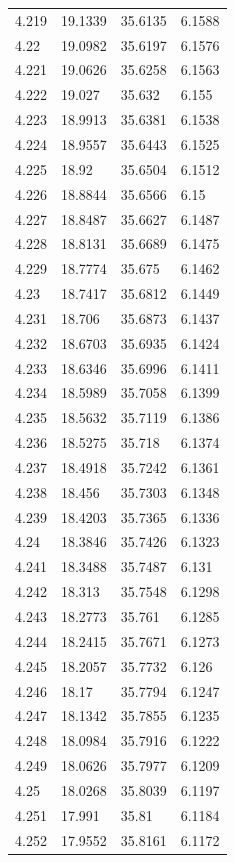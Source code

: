 \begin{tabular}{llll}
4.219 & 19.1339 & 35.6135 & 6.1588 \\
4.22 & 19.0982 & 35.6197 & 6.1576 \\
4.221 & 19.0626 & 35.6258 & 6.1563 \\
4.222 & 19.027 & 35.632 & 6.155 \\
4.223 & 18.9913 & 35.6381 & 6.1538 \\
4.224 & 18.9557 & 35.6443 & 6.1525 \\
4.225 & 18.92 & 35.6504 & 6.1512 \\
4.226 & 18.8844 & 35.6566 & 6.15 \\
4.227 & 18.8487 & 35.6627 & 6.1487 \\
4.228 & 18.8131 & 35.6689 & 6.1475 \\
4.229 & 18.7774 & 35.675 & 6.1462 \\
4.23 & 18.7417 & 35.6812 & 6.1449 \\
4.231 & 18.706 & 35.6873 & 6.1437 \\
4.232 & 18.6703 & 35.6935 & 6.1424 \\
4.233 & 18.6346 & 35.6996 & 6.1411 \\
4.234 & 18.5989 & 35.7058 & 6.1399 \\
4.235 & 18.5632 & 35.7119 & 6.1386 \\
4.236 & 18.5275 & 35.718 & 6.1374 \\
4.237 & 18.4918 & 35.7242 & 6.1361 \\
4.238 & 18.456 & 35.7303 & 6.1348 \\
4.239 & 18.4203 & 35.7365 & 6.1336 \\
4.24 & 18.3846 & 35.7426 & 6.1323 \\
4.241 & 18.3488 & 35.7487 & 6.131 \\
4.242 & 18.313 & 35.7548 & 6.1298 \\
4.243 & 18.2773 & 35.761 & 6.1285 \\
4.244 & 18.2415 & 35.7671 & 6.1273 \\
4.245 & 18.2057 & 35.7732 & 6.126 \\
4.246 & 18.17 & 35.7794 & 6.1247 \\
4.247 & 18.1342 & 35.7855 & 6.1235 \\
4.248 & 18.0984 & 35.7916 & 6.1222 \\
4.249 & 18.0626 & 35.7977 & 6.1209 \\
4.25 & 18.0268 & 35.8039 & 6.1197 \\
4.251 & 17.991 & 35.81 & 6.1184 \\
4.252 & 17.9552 & 35.8161 & 6.1172 \\

\end{tabular}
